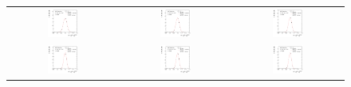 \begin{figure}[ht]
\begin{tabular}{ccc}
    \includegraphics[width=0.3\textwidth]{figures/ResFit_Spring10QCDFlat_Gauss_Eta0_MCClosure_PtBin4} &
    \includegraphics[width=0.3\textwidth]{figures/ResFit_Spring10QCDFlat_Gauss_Eta0_MCClosure_PtBin5} &
    \includegraphics[width=0.3\textwidth]{figures/ResFit_Spring10QCDFlat_Gauss_Eta0_MCClosure_PtBin6} \\

    \includegraphics[width=0.3\textwidth]{figures/ResFit_Spring10QCDFlat_Gauss_Eta0_MCClosure_PtBin7} &
    \includegraphics[width=0.3\textwidth]{figures/ResFit_Spring10QCDFlat_Gauss_Eta0_MCClosure_PtBin8} &
    \includegraphics[width=0.3\textwidth]{figures/ResFit_Spring10QCDFlat_Gauss_Eta0_MCClosure_PtBin9} \\


\end{tabular}
\end{figure}
